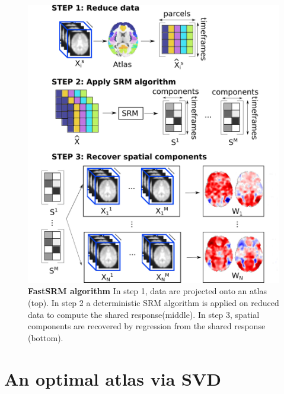 \documentclass{report}
\begin{document}
\begin{figure}
\centering
\includegraphics[scale=0.34]{figures/srm/conceptual_figure2.png}
\caption{\textbf{FastSRM algorithm} In step 1, data are projected onto an atlas (top). In step 2 a deterministic SRM algorithm is applied on reduced data to compute the shared response(middle). In step 3, spatial components are recovered by regression from the shared response (bottom).}
\label{fig:conceptual_figure2}
\end{figure}

\section{An optimal atlas via SVD}
\end{document}
